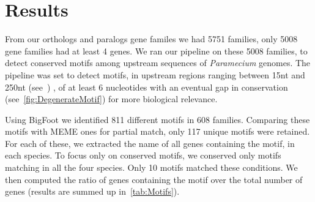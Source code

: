 \section*{Results}
\label{sec:Results}

From our orthologs and paralogs gene familes we had 5751 families, only 5008 gene families had at least 4 genes. We ran our pipeline on these 5008 families, to detect conserved motifs among upstream sequences of \textit{Paramecium} genomes. The pipeline was set to detect motifs, in upstream regions ranging between 15nt and 250nt (see~) , of at least 6 nucleotides with an eventual gap in conservation (see~\autoref{fig:DegenerateMotif}) for more biological relevance.

Using BigFoot we identified 811 different motifs in 608 families. Comparing these motifs with MEME ones for partial match, only 117 unique motifs were retained. For each of these, we extracted the name of all genes containing the motif, in each species. To focus only on conserved motifs, we conserved only motifs matching in all the four species. Only 10 motifs matched these conditions. We then computed the ratio of genes containing the motif over the total number of genes (results are summed up in~\autoref{tab:Motifs}).